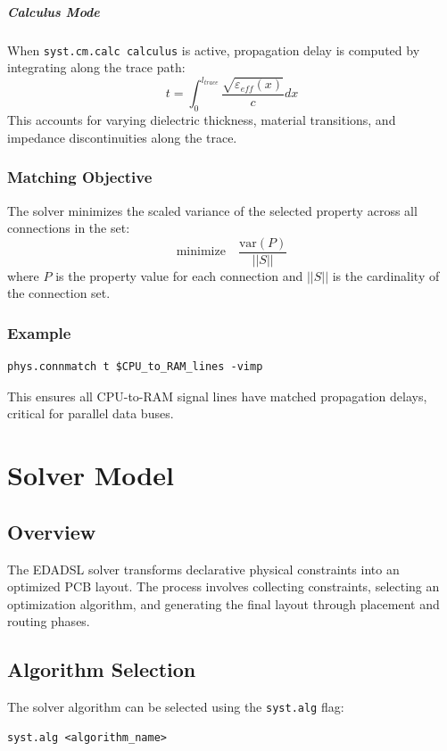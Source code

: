 \documentclass{report}
\begin{document}
\paragraph{Calculus Mode}
When \texttt{syst.cm.calc calculus} is active, propagation delay is computed by integrating along the trace path:
\begin{equation}
t = \int_0^{l_{trace}} \frac{\sqrt{\varepsilon_{eff}(x)}}{c} dx
\end{equation}
This accounts for varying dielectric thickness, material transitions, and impedance discontinuities along the trace.

\subsection{Matching Objective}
The solver minimizes the scaled variance of the selected property across all connections in the set:
\begin{equation}
\text{minimize} \quad \frac{\text{var}(P)}{||S||}
\end{equation}
where $P$ is the property value for each connection and $||S||$ is the cardinality of the connection set.

\subsection{Example}
\begin{verbatim}
phys.connmatch t $CPU_to_RAM_lines -vimp
\end{verbatim}
This ensures all CPU-to-RAM signal lines have matched propagation delays, critical for parallel data buses.


\chapter{Solver Model}
\label{sec:solver-model}

\section{Overview}
The EDADSL solver transforms declarative physical constraints into an optimized PCB layout. The process involves collecting constraints, selecting an optimization algorithm, and generating the final layout through placement and routing phases.

\section{Algorithm Selection}
The solver algorithm can be selected using the \texttt{syst.alg} flag:
\begin{verbatim}
syst.alg <algorithm_name>
\end{verbatim}
\end{document}
